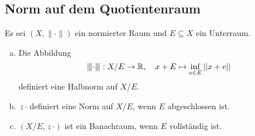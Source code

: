 \documentclass[FunkAnaskriptSS2017.tex]{subfiles}
\begin{document}
\subsection{Norm auf dem Quotientenraum}
\label{B4.1}
Es sei $(X, \|\cdot \|)$ ein normierter Raum und $E\subseteq X$ ein Unterraum.
\begin{beh}
	\begin{enumerate}[(a)]
	\item 	Die Abbildung
	$$ \interleave{\cdot}\interleave : X/E \to \mathbb{R},\quad x+E \mapsto \inf_{e\in E} \left\lvert \left\lvert x+e \right\rvert \right\rvert$$
	definiert eine Halbnorm auf $X/E$.
	
	\item 	$\semi{\cdot}$ definiert eine Norm auf $X/E$, wenn $E$ abgeschlossen ist. 	
	
	\item $(X/E, \semi{\cdot})$ ist ein Banachraum, wenn $E$ vollständig ist.
	
	\end{enumerate}
\end{beh}
\end{document}
